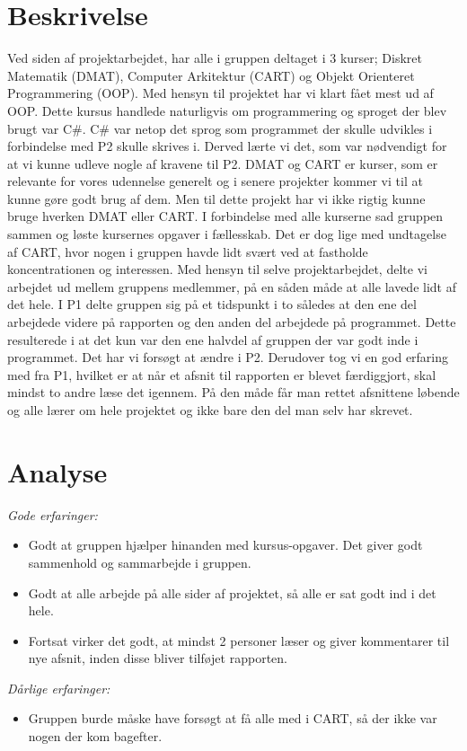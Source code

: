 \section{Beskrivelse}
Ved siden af projektarbejdet, har alle i gruppen deltaget i 3 kurser; Diskret Matematik (DMAT), Computer Arkitektur (CART) og Objekt Orienteret Programmering (OOP). Med hensyn til projektet har vi klart fået mest ud af OOP. Dette kursus handlede naturligvis om programmering og sproget der blev brugt var C\#. C\# var netop det sprog som programmet der skulle udvikles i forbindelse med P2 skulle skrives i. Derved lærte vi det, som var nødvendigt for at vi kunne udleve nogle af kravene til P2. DMAT og CART er kurser, som er relevante for vores udennelse generelt og i senere projekter kommer vi til at kunne gøre godt brug af dem. Men til dette projekt har vi ikke rigtig kunne bruge hverken DMAT eller CART.
I forbindelse med alle kurserne sad gruppen sammen og løste kursernes opgaver i fællesskab. Det er dog lige med undtagelse af CART, hvor nogen i gruppen havde lidt svært ved at fastholde koncentrationen og interessen.
Med hensyn til selve projektarbejdet, delte vi arbejdet ud mellem gruppens medlemmer, på en såden måde at alle lavede lidt af det hele. I P1 delte gruppen sig på et tidspunkt i to således at den ene del arbejdede videre på rapporten og den anden del arbejdede på programmet. Dette resulterede i at det kun var den ene halvdel af gruppen der var godt inde i programmet. Det har vi forsøgt at ændre i P2.
Derudover tog vi en god erfaring med fra P1, hvilket er at når et afsnit til rapporten er blevet færdiggjort, skal mindst to andre læse det igennem. På den måde får man rettet afsnittene løbende og alle lærer om hele projektet og ikke bare den del man selv har skrevet. 

\section{Analyse}

\emph{Gode erfaringer:}
\begin{itemize}
\item	Godt at gruppen hjælper hinanden med kursus-opgaver. Det giver godt sammenhold og sammarbejde i gruppen. 

\item	 Godt at alle arbejde på alle sider af projektet, så alle er sat godt ind i det hele.

\item	Fortsat virker det godt, at mindst 2 personer læser og giver kommentarer til nye afsnit, inden disse bliver tilføjet rapporten.
\end{itemize}\emph{Dårlige erfaringer:}
\begin{itemize}
\item	Gruppen burde måske have forsøgt at få alle med i CART, så der ikke var nogen der kom bagefter.

\end{itemize}	 

